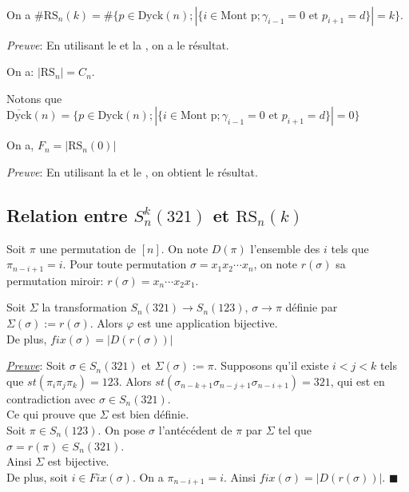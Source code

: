 \begin{corollaire}\label{SimNOfK} \text{ }\\
	On a $\#\text{RS}_{n}(k) = \# \{p \in \text{Dyck}(n); |\{i \in \text{Mont p}; \gamma_{i-1}=0 \text{ et } p_{i+1}=d\}|=k\}$.
\end{corollaire}
\textit{Preuve}: En utilisant le  et la , on a le résultat.

\begin{corollaire}
	On a:  $|\text{RS}_{n}|=C_{n}$.
\end{corollaire}
Notons que $\overline{\text{Dyck}}(n) = \{p \in \text{Dyck}(n); |\{i \in \text{Mont p}; \gamma_{i-1}=0 \text{ et } p_{i+1}=d\}|=0\}$

\begin{corollaire} \label{fnToSRn0}
	\begin{rm}
		On a, $F_{n}=|\text{RS}_{n}(0)|$
	\end{rm}
\end{corollaire}
\textit{Preuve}: En utilisant la  et le  , on obtient le résultat.


\subsection{Relation entre $S_{n}^{k}(321)$ et $\text{RS}_{n}(k)$}
\begin{definition}
	\begin{rm}
		Soit $\pi$ une permutation de $[n]$. On note $D(\pi)$ l'ensemble des $i$ tels que $\pi_{n-i+1}=i$. Pour toute permutation $\sigma=x_{1}x_{2}\cdots x_{n}$, on note $r(\sigma)$ sa permutation miroir: $r(\sigma)=x_{n}\cdots x_{2}x_{1}$.\vspace{10pt}
	\end{rm}
\end{definition}

\begin{proposition} \label{SKNBij}
	Soit $\Sigma$ la transformation $S_{n}(321)\longrightarrow S_{n}(123)$, $\sigma \longrightarrow \pi$ définie par  $\Sigma(\sigma):= r(\sigma)$. Alors $\varphi$ est une application bijective.\\
	De plus, $fix(\sigma)=|D(r(\sigma))|$
\end{proposition}

\underline{\textit{Preuve}}:
Soit $\sigma \in S_{n}(321)$ et $\Sigma(\sigma):=\pi$. Supposons qu'il existe $i<j<k$ tels que $st(\pi_{i}\pi_{j}\pi_{k})=123$. Alors $st(\sigma_{n-k+1}\sigma_{n-j+1}\sigma_{n-i+1})=321$, qui est en contradiction avec $\sigma \in S_{n}(321)$. \\Ce qui prouve que $\Sigma$ est bien définie.\\
Soit $\pi \in S_{n}(123)$. On pose $\sigma$ l'antécédent de $\pi$ par $\Sigma$ tel que $\sigma=r(\pi)\in S_{n}(321)$. \\
Ainsi $\Sigma$ est bijective.\\
De plus, soit $i\in Fix(\sigma)$. On a $\pi_{n-i+1}=i$. Ainsi $fix(\sigma)=|D(r(\sigma))|$. $\blacksquare$

